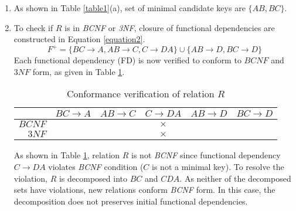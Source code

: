\begin{enumerate}
	\begin{enumerate}[label=(\alph*)]
	\item As shown in Table \ref{table1}(a), set of minimal candidate keys are $\{AB, BC\}$.
	\item To check if $R$ is in \textit{BCNF} or \textit{3NF}, closure of functional dependencies are constructed in Equation \ref{equation2}.
	\begin{equation}\label{equation2}
	F^+ = \{BC\rightarrow A, AB\rightarrow C, C\rightarrow DA\} \cup \{AB\rightarrow D, BC\rightarrow D\}
	\end{equation}
	Each functional dependency (FD) is now verified to conform to $BCNF$ and $3NF$ form, as given in Table \ref{table3}.
	\begin{table}[H]
	\centering\caption{Conformance verification of relation $R$}\label{table3}
	\begin{tabular}{|r||c|c|c|c|c|}
	\hline
	 & $BC\rightarrow A$ & $AB\rightarrow C$ & $C\rightarrow DA$ & $AB\rightarrow D$ & $BC\rightarrow D$ \\
	\hline
	$BCNF$ & \checkmark & \checkmark & $\times$ & \checkmark & \checkmark \\
	$3NF$ & \checkmark & \checkmark & $\times$ & \checkmark & \checkmark \\
	\hline
	\end{tabular}
	\end{table}
	As shown in Table \ref{table3}, relation $R$ is not \textit{BCNF} since functional dependency $C\rightarrow DA$ violates \textit{BCNF} condition ($C$ is not a minimal key).
	To resolve the violation, $R$ is decomposed into $BC$ and $CDA$.
	As neither of the decomposed sets have violations, new relations conform \textit{BCNF} form. In this case, the decomposition does not preserves initial functional dependencies.
	\end{enumerate}

\end{enumerate}
